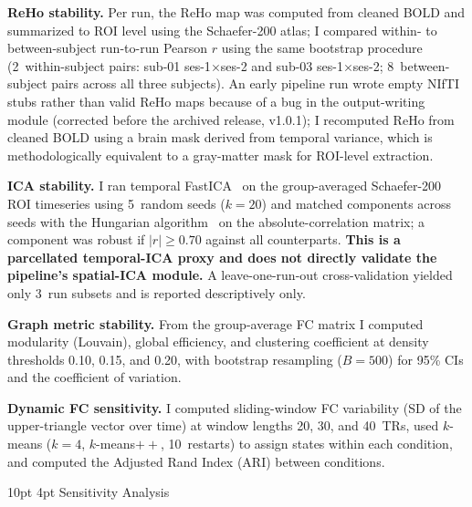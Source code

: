\documentclass[12pt]{article}
\makeatletter
\renewcommand\subsection{%
  \@startsection{subsection}{2}{\z@}%
    {10pt \@plus 2pt \@minus 1pt}%
    {4pt}%
    {\normalfont\normalsize\bfseries}}
\makeatother
\begin{document}
\textbf{ReHo stability.}
Per run, the ReHo map was computed from cleaned BOLD and summarized to
ROI level using the Schaefer-200 atlas; I compared within- to
between-subject run-to-run Pearson $r$ using the same bootstrap
procedure (2~within-subject pairs: sub-01 ses-1$\times$ses-2 and sub-03
ses-1$\times$ses-2; 8~between-subject pairs across all three subjects).
An early pipeline run wrote empty NIfTI stubs rather than valid ReHo
maps because of a bug in the output-writing module (corrected before
the archived release, v1.0.1); I recomputed ReHo from cleaned BOLD
using a brain mask derived from temporal variance, which is
methodologically equivalent to a gray-matter mask for ROI-level
extraction.

\textbf{ICA stability.}
I ran temporal FastICA~\citep{hyvarinen1999fast} on the group-averaged
Schaefer-200 ROI timeseries using 5~random seeds ($k = 20$) and matched
components across seeds with the Hungarian
algorithm~\citep{kuhn1955hungarian} on the absolute-correlation matrix;
a component was robust if $|r| \geq 0.70$ against all counterparts.
\textbf{This is a parcellated temporal-ICA proxy and does not directly
validate the pipeline's spatial-ICA module.} A leave-one-run-out
cross-validation yielded only 3~run subsets and is reported
descriptively only.

\textbf{Graph metric stability.}
From the group-average FC matrix I computed modularity (Louvain), global
efficiency, and clustering coefficient at density thresholds 0.10, 0.15,
and 0.20, with bootstrap resampling ($B = 500$) for 95\% CIs and the
coefficient of variation.

\textbf{Dynamic FC sensitivity.}
I computed sliding-window FC variability (SD of the upper-triangle
vector over time) at window lengths 20, 30, and 40~TRs, used
$k$-means ($k = 4$, $k$-means$++$, 10~restarts) to assign states within
each condition, and computed the Adjusted Rand Index (ARI) between
conditions.

\subsection{Sensitivity Analysis}
\end{document}

